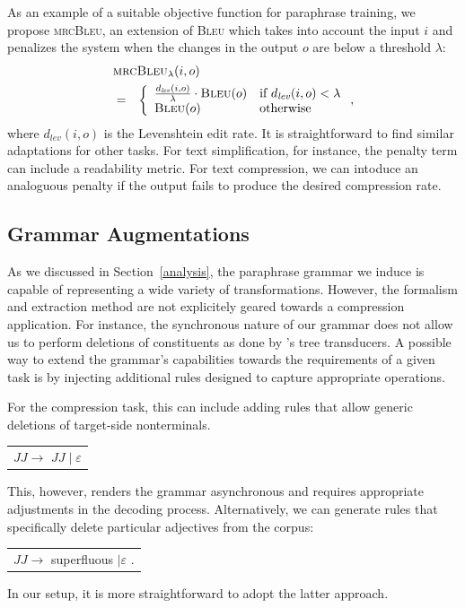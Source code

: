 \documentclass[11pt]{article}
\begin{document}
As an example of a suitable objective function for paraphrase
training, we propose \textsc{mrcBleu}, an extension of \textsc{Bleu}
which takes into account the input $i$ and penalizes the system when
the changes in the output $o$ are below a threshold $\lambda$:
\begin{eqnarray}
  \lefteqn{ \textsc{mrcBleu}_\lambda(i, o) } \nonumber\\
  &=& \left\{ \begin{array}{ll}
      \frac{d_{\mathit{lev}}(i, o)}{\lambda} \cdot \textsc{Bleu}(o) & \textrm{if
        $d_{\mathit{lev}}(i, o) <\lambda$} \nonumber \\ 
      \textsc{Bleu}(o) & \textrm{otherwise}
\end{array} \right. ,
\end{eqnarray}
where $d_{\mathit{lev}}(i, o)$ is the Levenshtein edit rate. It is
straightforward to find similar adaptations for other tasks. For text
simplification, for instance, the penalty term can include a
readability metric. For text compression, we can intoduce an
analoguous penalty if the output fails to produce the desired
compression rate.


\subsection{Grammar Augmentations} \label{injection}

As we discussed in Section~\ref{analysis}, the paraphrase grammar we
induce is capable of representing a wide variety of
transformations. However, the formalism and extraction method are not
explicitely geared towards a compression application. For instance,
the synchronous nature of our grammar does not allow us to perform
deletions of constituents as done by 's tree
transducers.  A possible way to extend the grammar's capabilities
towards the requirements of a given task is by injecting additional
rules designed to capture appropriate operations.

For the compression task, this can include adding rules that allow
generic deletions of target-side nonterminals. 
\begin{center}
\begin{tabular}{c}
 $\mathit{JJ} \rightarrow$ $\mathit{JJ} \mid \varepsilon$ \\
\end{tabular}
\end{center}
This, however, renders the grammar asynchronous and requires
appropriate adjustments in the decoding process. Alternatively, we can
generate rules that specifically delete particular adjectives from the
corpus:
\begin{center}
\begin{tabular}{c}
 $\mathit{JJ} \rightarrow$ superfluous $\mid \varepsilon$ .\\
\end{tabular}
\end{center}
In our setup, it is more straightforward to adopt the latter approach.
\end{document}
